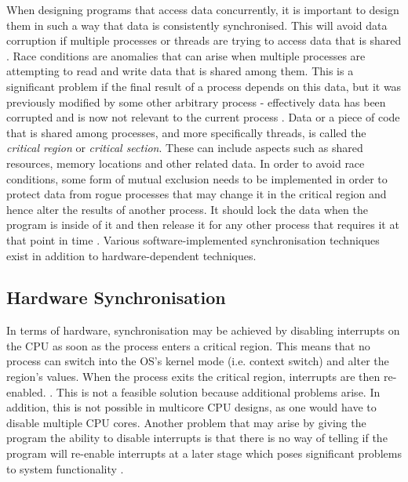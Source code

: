 \documentclass[12pt,a4paper,oneside]{article}
\begin{document}
  When designing programs that access data concurrently, it is important to design them in such a way that data is consistently synchronised. This will avoid data corruption if multiple processes or threads are trying to access data that is shared \citep{garg2005concurrent}. Race conditions are anomalies that can arise when multiple processes are attempting to read and write data that is shared among them. This is a significant problem if the final result of a process depends on this data, but it was previously modified by some other arbitrary process - effectively data has been corrupted and is now not relevant to the current process \citep{modernOS}. Data or a piece of code that is shared among processes, and more specifically threads, is called the \textit{critical region} or \textit{critical section}. These can include aspects such as shared resources, memory locations and other related data. In order to avoid race conditions, some form of mutual exclusion needs to be implemented in order to protect data from rogue processes that may change it in the critical region and hence alter the results of another process. It should lock the data when the program is inside of it and then release it for any other process that requires it at that point in time \citep{multithreadingwin32}. Various software-implemented synchronisation techniques exist in addition to hardware-dependent techniques.

  \subsection{Hardware Synchronisation}
    In terms of hardware, synchronisation may be achieved by disabling interrupts on the CPU as soon as the process enters a critical region. This means that no process can switch into the OS's kernel mode (i.e. context switch) and alter the region's values. When the process exits the critical region, interrupts are then re-enabled. \citep{garg2005concurrent}. This is not a feasible solution because additional problems arise. In addition, this is not possible in multicore CPU designs, as one would have to disable multiple CPU cores. Another problem that may arise by giving the program the ability to disable interrupts is that there is no way of telling if the program will re-enable interrupts at a later stage which poses significant problems to system functionality \citep{modernOS}.
\end{document}
